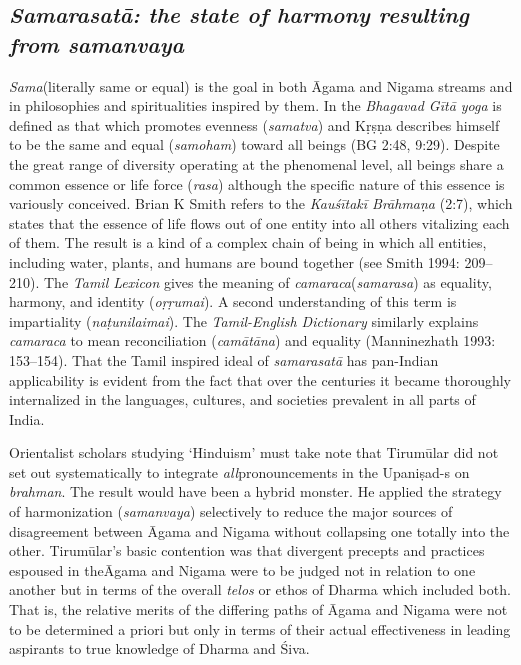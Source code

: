 \subsection*{\textit{Samarasatā: the state of harmony resulting from samanvaya}}

\textit{Sama}(literally same or equal) is the goal in both Āgama and Nigama streams and in philosophies and spiritualities inspired by them. In the \textit{Bhagavad Gītā yoga} is defined as that which promotes evenness (\textit{samatva}) and Kṛṣṇa describes himself to be the same and equal (\textit{samoham}) toward all beings (BG 2:48, 9:29). Despite the great range of diversity operating at the phenomenal level, all beings share a common essence or life force (\textit{rasa}) although the specific nature of this essence is variously conceived. Brian K Smith refers to the \textit{Kauśītakī Brāhmaṇa} (2:7), which states that the essence of life flows out of one entity into all others vitalizing each of them. The result is a kind of a complex chain of being in which all entities, including water, plants, and humans are bound together (see Smith 1994: 209–210). The \textit{Tamil Lexicon} gives the meaning of \textit{camaraca}(\textit{samarasa}) as equality, harmony, and identity (\textit{oṛṛumai}). A second understanding of this term is impartiality (\textit{naṭunilaimai}). The \textit{Tamil-English Dictionary} similarly explains \textit{camaraca} to mean reconciliation (\textit{camātāna}) and equality (Manninezhath 1993: 153–154). That the Tamil inspired ideal of \textit{samarasatā} has pan-Indian applicability is evident from the fact that over the centuries it became thoroughly internalized in the languages, cultures, and societies prevalent in all parts of India.

Orientalist scholars studying ‘Hinduism’ must take note that Tirumūlar did not set out systematically to integrate \textit{all}pronouncements in the Upaniṣad-s on \textit{brahman}. The result would have been a hybrid monster. He applied the strategy of harmonization (\textit{samanvaya}) selectively to reduce the major sources of disagreement between Āgama and Nigama without collapsing one totally into the other. Tirumūlar’s basic contention was that divergent precepts and practices espoused in the\break Āgama and Nigama were to be judged not in relation to one another but in terms of the overall \textit{telos} or ethos of Dharma which included both. That is, the relative merits of the differing paths of Āgama and Nigama were not to be determined a priori but only in terms of their actual effectiveness in leading aspirants to true knowledge of Dharma and Śiva.


